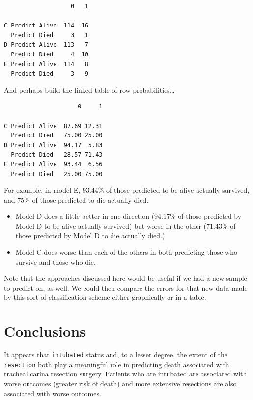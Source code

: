 \documentclass[]{book}
\newenvironment{Shaded}{\begin{snugshade}}{\end{snugshade}}
\newcommand{\KeywordTok}[1]{\textcolor[rgb]{0.13,0.29,0.53}{\textbf{#1}}}
\newcommand{\DecValTok}[1]{\textcolor[rgb]{0.00,0.00,0.81}{#1}}
\newcommand{\OperatorTok}[1]{\textcolor[rgb]{0.81,0.36,0.00}{\textbf{#1}}}
\newcommand{\NormalTok}[1]{#1}
\providecommand{\tightlist}{%
  \setlength{\itemsep}{0pt}\setlength{\parskip}{0pt}}
\theoremstyle{definition}
\theoremstyle{definition}
\theoremstyle{definition}
\theoremstyle{remark}
\begin{document}
\begin{verbatim}
                   0   1
                        
C Predict Alive  114  16
  Predict Died     3   1
D Predict Alive  113   7
  Predict Died     4  10
E Predict Alive  114   8
  Predict Died     3   9
\end{verbatim}

And perhaps build the linked table of row probabilities\ldots{}

\begin{Shaded}
\end{Shaded}

\begin{verbatim}
                     0     1
                            
C Predict Alive  87.69 12.31
  Predict Died   75.00 25.00
D Predict Alive  94.17  5.83
  Predict Died   28.57 71.43
E Predict Alive  93.44  6.56
  Predict Died   25.00 75.00
\end{verbatim}

For example, in model E, 93.44\% of those predicted to be alive actually
survived, and 75\% of those predicted to die actually died.

\begin{itemize}
\tightlist
\item
  Model D does a little better in one direction (94.17\% of those
  predicted by Model D to be alive actually survived) but worse in the
  other (71.43\% of those predicted by Model D to die actually died.)
\item
  Model C does worse than each of the others in both predicting those
  who survive and those who die.
\end{itemize}

Note that the approaches discussed here would be useful if we had a new
sample to predict on, as well. We could then compare the errors for that
new data made by this sort of classification scheme either graphically
or in a table.

\section{Conclusions}\label{conclusions}

It appears that \texttt{intubated} status and, to a lesser degree, the
extent of the \texttt{resection} both play a meaningful role in
predicting death associated with tracheal carina resection surgery.
Patients who are intubated are associated with worse outcomes (greater
risk of death) and more extensive resections are also associated with
worse outcomes.


\end{document}
